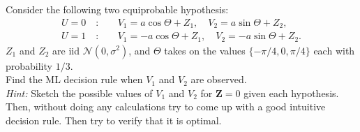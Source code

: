\documentclass{assignment}
\begin{document}
\begin{prob}
    Consider the following two equiprobable hypothesis:
    \begin{align*}
        U=0\quad:&\quad V_1=a\cos\Theta+Z_1,\quad V_2=a\sin\Theta+Z_2,\\
        U=1\quad:&\quad V_1=-a\cos\Theta+Z_1,\quad V_2=-a\sin\Theta+Z_2.
    \end{align*}
    $Z_1$ and $Z_2$ are iid $\mathcal{N}(0,\sigma^2)$, and $\Theta$ takes on the values $\{-\pi/4,0,\pi/4\}$ each with probability $1/3$.\\
    Find the ML decision rule when $V_1$ and $V_2$ are observed.\\
    \emph{Hint:} Sketch the possible values of $V_1$ and $V_2$ for $\bm{Z}=0$ given each hypothesis. Then, without doing any calculations try to come up with a good intuitive decision rule. Then try to verify that it is optimal.
\end{prob}
\end{document}
